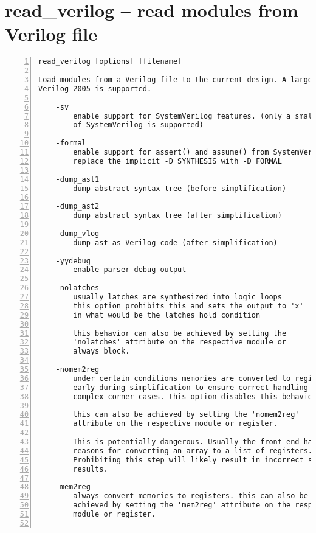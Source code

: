 \section{read\_verilog -- read modules from Verilog file}
\label{cmd:read_verilog}
\begin{lstlisting}[numbers=left,frame=single]
    read_verilog [options] [filename]

Load modules from a Verilog file to the current design. A large subset of
Verilog-2005 is supported.

    -sv
        enable support for SystemVerilog features. (only a small subset
        of SystemVerilog is supported)

    -formal
        enable support for assert() and assume() from SystemVerilog
        replace the implicit -D SYNTHESIS with -D FORMAL

    -dump_ast1
        dump abstract syntax tree (before simplification)

    -dump_ast2
        dump abstract syntax tree (after simplification)

    -dump_vlog
        dump ast as Verilog code (after simplification)

    -yydebug
        enable parser debug output

    -nolatches
        usually latches are synthesized into logic loops
        this option prohibits this and sets the output to 'x'
        in what would be the latches hold condition

        this behavior can also be achieved by setting the
        'nolatches' attribute on the respective module or
        always block.

    -nomem2reg
        under certain conditions memories are converted to registers
        early during simplification to ensure correct handling of
        complex corner cases. this option disables this behavior.

        this can also be achieved by setting the 'nomem2reg'
        attribute on the respective module or register.

        This is potentially dangerous. Usually the front-end has good
        reasons for converting an array to a list of registers.
        Prohibiting this step will likely result in incorrect synthesis
        results.

    -mem2reg
        always convert memories to registers. this can also be
        achieved by setting the 'mem2reg' attribute on the respective
        module or register.


\end{lstlisting}
